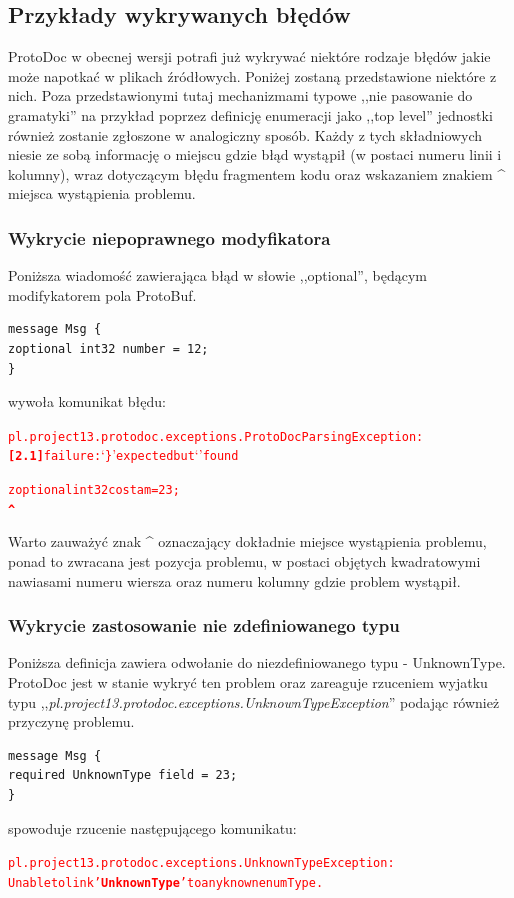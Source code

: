 \documentclass[a4paper]{article}
\begin{document}
\newpage
\subsection{Przykłady wykrywanych błędów}
ProtoDoc w obecnej wersji potrafi już wykrywać niektóre rodzaje błędów jakie może napotkać w plikach źródłowych.
Poniżej zostaną przedstawione niektóre z nich. Poza przedstawionymi tutaj mechanizmami typowe ,,nie pasowanie do gramatyki''  
na przykład poprzez definicję enumeracji jako ,,top level'' jednostki również zostanie zgłoszone w analogiczny sposób. 
Każdy z tych składniowych niesie ze sobą informację o miejscu gdzie błąd wystąpił (w postaci numeru linii i kolumny), 
wraz dotyczącym błędu fragmentem kodu oraz wskazaniem znakiem \textbf{\^} miejsca wystąpienia problemu.

\subsubsection{Wykrycie niepoprawnego modyfikatora}
Poniższa wiadomość zawierająca błąd w słowie ,,optional'', będącym modifykatorem pola ProtoBuf.
\begin{verbatim}
message Msg {
zoptional int32 number = 12;
}
\end{verbatim}

wywoła komunikat błędu:
\begin{alltt}
\textcolor{Red}{pl.project13.protodoc.exceptions.ProtoDocParsingException: 
\textbf{[2.1]} failure: `\}' expected but `' found 

zoptional int32 costam = 23;
\textbf{\^} }
\end{alltt}
Warto zauważyć znak \textbf{\^} oznaczający dokładnie miejsce wystąpienia problemu, ponad to zwracana jest pozycja problemu, w postaci objętych
kwadratowymi nawiasami numeru wiersza oraz numeru kolumny gdzie problem wystąpił.

\subsubsection{Wykrycie zastosowanie nie zdefiniowanego typu}
Poniższa definicja zawiera odwołanie do niezdefiniowanego typu - UnknownType. ProtoDoc jest w stanie wykryć ten problem oraz zareaguje 
rzuceniem wyjatku typu ,,\textit{pl.project13.protodoc.exceptions.UnknownTypeException}'' podając również przyczynę problemu.
\begin{verbatim}
message Msg {
required UnknownType field = 23;
} 
\end{verbatim}
spowoduje rzucenie następującego komunikatu:
\begin{alltt}
\textcolor{Red}{pl.project13.protodoc.exceptions.UnknownTypeException: 
Unable to link '\textbf{UnknownType}' to any known enum Type.}
\end{alltt}
\end{document}
